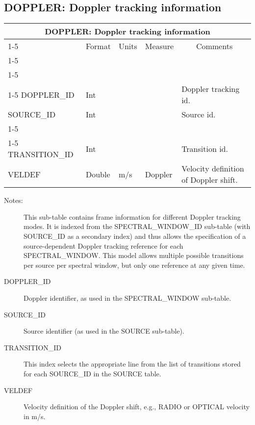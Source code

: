 \documentclass{article}
\newcommand{\defline}[1]{\cline{1-5}
\multicolumn{5}{|l|}{#1} \\
\cline{1-5}}
\newcommand{\definetable}[2]
{
	\vfill\newpage
	\subsection{#1}
        \vspace{0.15in}
        \small
	\begin{tabular}{|l|p{1.25in}|l|p{.9in}|p{1.4in}|}
	\hline
	\multicolumn{5}{|c|}{\bf #1}\\ 
	\cline{1-5}
        \multicolumn{1}{|c|}{Name}&\multicolumn{1}{|c|}{Format}&
        \multicolumn{1}{|c|}{Units}&\multicolumn{1}{|c|}{Measure}&
        \multicolumn{1}{|c|}{Comments}\\
        \cline{1-5}
        #2
        \hline
	\end{tabular}
}
\begin{document}
\definetable{DOPPLER: Doppler tracking information}{
\defline{\bf Columns}
\defline{\em Key}
DOPPLER\_ID  & Int & & & Doppler tracking id.\\
SOURCE\_ID  & Int & & & Source id.\\
\defline{\em Data}
TRANSITION\_ID & Int & & & Transition id.\\
VELDEF & Double & m/s & Doppler & Velocity definition of Doppler shift.\\
}
\begin{description}

\item[Notes:] This sub-table contains frame information 
for different Doppler tracking modes. It is indexed from the
SPECTRAL\_WINDOW\_ID sub-table (with SOURCE\_ID as a secondary index)
and thus allows the specification of a source-dependent Doppler
tracking reference for each SPECTRAL\_WINDOW. This model allows
multiple possible transitions per source per spectral window, but only
one reference at any given time.

\item[DOPPLER\_ID] Doppler identifier, as used in the SPECTRAL\_WINDOW
sub-table.

\item[SOURCE\_ID] Source identifier (as used in the SOURCE sub-table).

\item[TRANSITION\_ID] This index selects the appropriate line from the
list of transitions stored for each SOURCE\_ID in the SOURCE table.

\item[VELDEF] Velocity definition of the Doppler shift, e.g., RADIO or
OPTICAL velocity in m/s.

\end{description}
\end{document}
